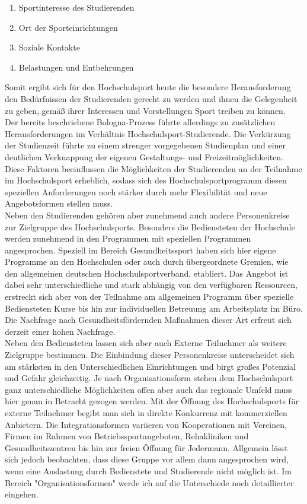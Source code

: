 \begin{enumerate}
	\item Sportinteresse des Studierenden
	\item Ort der Sporteinrichtungen
	\item Soziale Kontakte
	\item Belastungen und Entbehrungen
\end{enumerate}

Somit ergibt sich für den Hochschulsport heute die besondere Herausforderung den Bedürfnissen der Studierenden gerecht zu werden und ihnen die Gelegenheit zu geben, gemäß ihrer Interessen und Vorstellungen Sport treiben zu können. \\
Der bereits beschriebene Bologna-Prozess führte allerdings zu zusätzlichen Herausforderungen im Verhältnis Hochschulsport-Studierende. Die Verkürzung der Studienzeit führte zu einem strenger vorgegebenen Studienplan und einer deutlichen Verknappung der eigenen Gestaltungs- und Freizeitmöglichkeiten. Diese Faktoren beeinflussen die Möglichkeiten der Studierenden an der Teilnahme im Hochschulsport erheblich, sodass sich des Hochschulsportprogramm diesen speziellen Anforderungen noch stärker durch mehr Flexibilität und neue Angebotsformen stellen muss.
\\

Neben den Studierenden gehören aber zunehmend auch andere Personenkreise zur Zielgruppe des Hochschulsports. Besonders die Bediensteten der Hochschule werden zunehmend in den Programmen mit speziellen Programmen angesprochen. Speziell im Bereich Gesundheitssport haben sich hier eigene Programme an den Hochschulen oder auch durch übergeordnete Gremien, wie den allgemeinen deutschen Hochschulsportverband, etabliert. Das Angebot ist dabei sehr unterschiedliche und stark abhängig von den verfügbaren Ressourcen, erstreckt sich aber von der Teilnahme am allgemeinen Programm über spezielle Bediensteten Kurse bis hin zur individuellen Betreuung am Arbeitsplatz im Büro. Die Nachfrage nach Gesundheitsfördernden Maßnahmen dieser Art erfreut sich derzeit einer hohen Nachfrage. \\
Neben den Bediensteten lassen sich aber auch Externe Teilnehmer als weitere Zielgruppe bestimmen. Die Einbindung dieser Personenkreise unterscheidet sich am stärksten in den Unterschiedlichen Einrichtungen und birgt großes Potenzial und Gefahr gleichzeitig. Je nach Organisationsform stehen dem Hochschulsport ganz unterschiedliche Möglichkeiten offen aber auch das regionale Umfeld muss hier genau in Betracht gezogen werden. Mit der Öffnung des Hochschulsports für externe Teilnehmer begibt man sich in direkte Konkurrenz mit kommerziellen Anbietern. Die Integrationsformen variieren von Kooperationen mit Vereinen, Firmen im Rahmen von Betriebssportangeboten, Rehakliniken und Gesundheitszentren bis hin zur freien Öffnung für Jedermann. Allgemein lässt sich jedoch beobachten, dass diese Gruppe vor allem dann angesprochen wird, wenn eine Auslastung durch Bedienstete und Studierende nicht möglich ist. Im Bereich "Organisationsformen" werde ich auf die Unterschiede noch detaillierter eingehen.  


